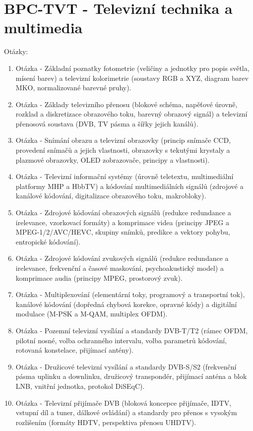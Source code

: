 \part{BPC-TVT - Televizní technika a multimedia}
\begin{huge}
	Otázky:
	\newline
\end{huge}
\begin{enumerate}
	\item Otázka - Základní poznatky fotometrie (veličiny a jednotky pro popis světla, mísení barev) a televizní kolorimetrie (soustavy RGB a XYZ, diagram barev MKO, normalizované barevné pruhy).
	\item Otázka - Základy televizního přenosu (blokové schéma, napěťové úrovně, rozklad a diskretizace obrazového toku, barevný obrazový signál) a televizní přenosová soustava (DVB, TV pásma a šířky jejich kanálů).
	\item Otázka - Snímání obrazu a televizní obrazovky (princip snímače CCD, provedení snímačů a jejich vlastnosti, obrazovky s tekutými krystaly a plazmové obrazovky, OLED zobrazovače, principy a vlastnosti).
	\item Otázka - Televizní informační systémy (úrovně teletextu, multimediální platformy MHP a HbbTV) a kódování multimediálních signálů (zdrojové a kanálové kódování, digitalizace obrazového toku, makrobloky).
	\item Otázka - Zdrojové kódování obrazových signálů (redukce redundance a irelevance, vzorkovací formáty) a komprimace videa (principy JPEG a MPEG-1/2/AVC/HEVC, skupiny snímků, predikce a vektory pohybu, entropické kódování).
	\item Otázka - Zdrojové kódování zvukových signálů (redukce redundance a irelevance, frekvenční a časové maskování, psychoakustický model) a komprimace audia (principy MPEG, prostorový zvuk).
	\item Otázka - Multiplexování (elementární toky, programový a transportní tok), kanálové kódování (dopředná chybová korekce, opravné kódy) a digitální modulace (M-PSK a M-QAM, multiplex OFDM).
	\item Otázka - Pozemní televizní vysílání a standardy DVB-T/T2 (rámec OFDM, pilotní nosné, volba ochranného intervalu, volba parametrů kódování, rotovaná konstelace, přijímací antény).
	\item Otázka - Družicové televizní vysílání a standardy DVB-S/S2 (frekvenční pásma uplinku a downlinku, družicový transpondér, přijímací anténa a blok LNB, vnitřní jednotka, protokol DiSEqC).
	\item Otázka - Televizní přijímače DVB (bloková koncepce přijímače, IDTV, vstupní díl a tuner, dálkové ovládání) a standardy pro přenos s vysokým rozlišením (formáty HDTV, perspektiva přenosu UHDTV).
\end{enumerate}
\newpage
